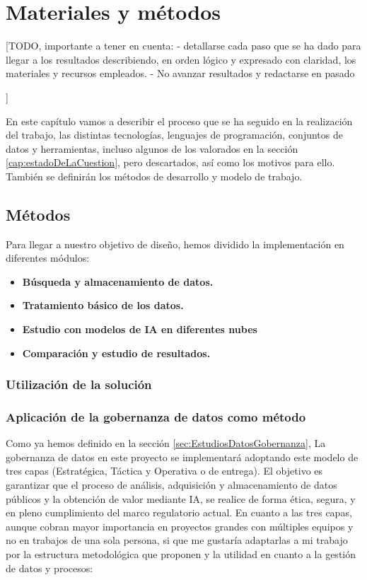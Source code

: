\chapter{Materiales y métodos}
\label{cap:Materiales y metodos}

[TODO, importante a tener en cuenta:
 -  detallarse cada paso que se ha dado para llegar a los resultados describiendo, en orden lógico y expresado con claridad, los materiales y recursos empleados. 
 - No avanzar resultados y redactarse en pasado

]

En este capítulo vamos a describir el proceso que se ha seguido en la realización del trabajo, las distintas tecnologías, lenguajes de programación, conjuntos de datos y herramientas, incluso algunos de los valorados en la sección \ref{cap:estadoDeLaCuestion}, pero descartados, así como los motivos para ello. También se definirán los métodos de desarrollo y modelo de trabajo.


\section{Métodos}

Para llegar a nuestro objetivo de diseño, hemos dividido la implementación en diferentes módulos:

\begin{itemize}
	\item \textbf{ Búsqueda y almacenamiento de datos.}
	\item \textbf{ Tratamiento básico de los datos.}
	\item \textbf{ Estudio con modelos de IA en diferentes nubes}
	\item \textbf{ Comparación y estudio de resultados.}
\end{itemize}

\subsection{Utilización de la solución}


\subsection{Aplicación de la gobernanza de datos como método}  \label{sec:Metodos_Gobernanza}

Como ya hemos definido en la sección \ref{sec:EstudiosDatosGobernanza}, La gobernanza de datos en este proyecto se implementará adoptando este modelo de tres capas (Estratégica, Táctica y Operativa o de entrega). El objetivo es garantizar que el proceso de análisis, adquisición y almacenamiento de datos públicos y la obtención de valor mediante IA, se realice de forma ética, segura, y en pleno cumplimiento del marco regulatorio actual. En cuanto a las tres capas, aunque cobran mayor importancia en proyectos grandes con múltiples equipos y no en trabajos de una sola persona, si que me gustaría adaptarlas a mi trabajo por la estructura metodológica que proponen y la utilidad en cuanto a la gestión de datos y procesos:

